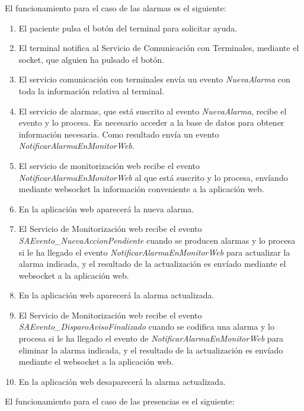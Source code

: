 El funcionamiento para el caso de las alarmas es el siguiente:
\begin{enumerate}
	\item El paciente pulsa el botón del terminal para solicitar ayuda.	
	\item El terminal notifica al Servicio de Comunicación con Terminales, mediante el socket, que alguien ha pulsado el botón.
	\item El servicio comunicación con terminales envía un evento \textit{NuevaAlarma} con toda la información relativa al terminal.
	\item El servicio de alarmas, que está suscrito al evento \textit{NuevaAlarma}, recibe el evento y lo procesa. Es necesario acceder a la base de datos para obtener información necesaria. Como resultado envía un evento \textit{NotificarAlarmaEnMonitorWeb}.
	\item El servicio de monitorización web recibe el evento \textit{NotificarAlarmaEnMonitorWeb} al que está suscrito y lo procesa, envíando mediante websocket la información conveniente a la aplicación web.
	\item En la aplicación web aparecerá la nueva alarma.
	\item El Servicio de Monitorización web recibe el evento \textit{SAEvento\_NuevaAccionPendiente} cuando se producen alarmas y lo procesa si le ha llegado el evento \textit{NotificarAlarmaEnMonitorWeb} para actualizar la alarma indicada, y el resultado de la actualización es envíado mediante el websocket a la aplicación web.
	\item En la aplicación web aparecerá la alarma actualizada.
	\item El Servicio de Monitorización web recibe el evento \textit{SAEvento\_DisparoAvisoFinalizado} cuando se codifica una alarma y lo procesa si le ha llegado el evento de \textit{NotificarAlarmaEnMonitorWeb} para eliminar la alarma indicada, y el resultado de la actualización es envíado mediante el websocket a la aplicación web.
	\item En la aplicación web desaparecerá la alarma actualizada.
\end{enumerate}

El funcionamiento para el caso de las presencias es el siguiente:

